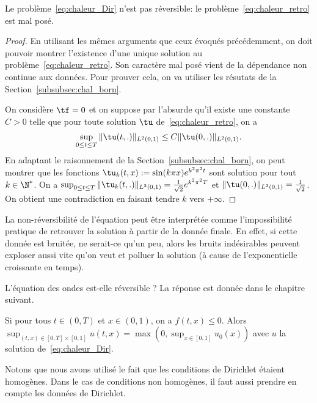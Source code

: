 \documentclass[12pt,a4paper,twoside]{article}
\begin{document}
\begin{proposition}
  Le probl\`eme~\eqref{eq:chaleur_Dir} n'est pas r\'eversible:
  le probl\`eme~\eqref{eq:chaleur_retro} est mal pos\'e.
\end{proposition}

\begin{proof}
  En utilisant les m\^emes arguments que ceux \'evoqu\'es pr\'ec\'edemment,
  on doit pouvoir montrer l'existence d'une unique solution au probl\`eme~\eqref{eq:chaleur_retro}.
  Son caract\`ere mal pos\'e vient de la d\'ependance non continue aux donn\'ees.
  Pour prouver cela, on va utiliser les r\'esutats de la Section~\ref{subsubsec:chal_born}.


  On consid\`ere $\tf = 0$ et on suppose par l'absurde qu'il existe une constante $C>0$ telle que
  pour toute solution $\tu$ de~\eqref{eq:chaleur_retro}, on a
  \begin{align*}
    \sup_{0 \leq t \leq T} \| \tu(t,.) \|_{L^2(0,1)} \leq C \| \tu(0,.) \|_{L^2(0,1)} .
  \end{align*}
  En adaptant le raisonnement de la Section~\ref{subsubsec:chal_born}, on peut montrer que
  les fonctions $\tu_k (t,x) := \sin(k\pi x) e^{k^2 \pi^2 t}$ sont solution pour tout $k \in \N^*$.
  On a $\sup_{0 \leq t \leq T} \| \tu_k(t,.) \|_{L^2(0,1)} = \frac1{\sqrt2} e^{k^2 \pi^2 T}$ et 
  $\| \tu(0,.) \|_{L^2(0,1)} = \frac1{\sqrt2}$. On obtient une contradiction en faisant tendre $k$
  vers $+ \infty$.
\end{proof}


\begin{remark}
  La non-r\'eversibilit\'e de l'\'equation peut \^etre interpr\'et\'ee comme l'impossibilit\'e
  pratique de retrouver la solution \`a partir de la donn\'ee finale.
  En effet, si cette donn\'ee est bruit\'ee, ne serait-ce qu'un peu, alors les bruits
  ind\'esirables peuvent exploser aussi vite qu'on veut et polluer la solution
  (\`a cause de l'exponentielle croissante en temps).
\end{remark}

\begin{exercise}
  L'\'equation des ondes est-elle r\'eversible ?
  La r\'eponse est donn\'ee dans le chapitre suivant.
\end{exercise}


\begin{proposition}
  Si pour tous $t \in (0,T)$ et $x \in (0,1)$, on a $f(t,x) \leq 0$.
  Alors $\sup_{(t,x) \in [0,T] \times [0,1]} u(t,x) = \max(0, \sup_{x \in [0,1]} u_0(x))$
  avec $u$ la solution de~\eqref{eq:chaleur_Dir}.
\end{proposition}
Notons que nous avons utilis\'e le fait que les conditions de Dirichlet \'etaient homog\`enes.
Dans le cas de conditions non homog\`enes, il faut aussi prendre en compte
les donn\'ees de Dirichlet.
\end{document}
